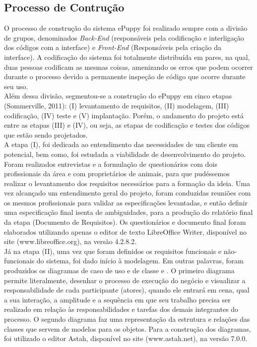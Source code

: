 \subsection{Processo de Contrução}
O processo de construção do sistema ePuppy foi realizado sempre com a divisão de grupos, denominados {\it Back-End} (responsáveis pela codificação e interligação dos códigos com a interface) e {\it Front-End} (Responsáveis pela criação da interface). A codificação do sistema foi totalmente distribuída em pares, na qual, duas pessoas codificam as mesmas coisas, amenizando os erros que podem ocorrer durante o processo devido a permanente inspeção de código que ocorre durante seu uso.
\\
\indent
Além dessa divisão, segmentou-se a construção do ePuppy em cinco etapas (Sommerville, 2011): (I) levantamento de requisitos, (II) modelagem, (III) codificação, (IV) teste e (V) implantação. Porém, o andamento do projeto está entre as etapas (III) e (IV), ou seja, as etapas de codificação e testes dos códigos que estão sendo projetados.
\\
\indent
	A etapa (I), foi dedicada ao entendimento das necessidades de um cliente em potencial, bem como, foi estudada a viabilidade de desenvolvimento do projeto. Foram realizados entrevistas e a formulação de questionários com dois profissionais da área e com proprietários de animais, para que pudéssemos realizar o levantamento dos requisitos necessários para a formação da ideia. Uma vez alcançado um entendimento geral do projeto, foram conduzidas reuniões com os mesmos profissionais para validar as especificações levantadas, e então definir uma especificação final isenta de ambiguidades, para a produção do relatório final da etapa (Documento de Requisitos). Os questionários e documento final foram elaborados utilizando apenas o editor de texto LibreOffice Writer, disponível no site (www.libreoffice.org), na versão 4.2.8.2.
\\
\indent
Já na etapa (II), uma vez que foram definidos os requisitos funcionais e não-funcionais do sistema, foi dado início à modelagem. Em outras palavras, foram produzidos os diagramas de caso de uso e de classe \cite{Fowler2005} e \cite{Bezerra2002}. O primeiro diagrama permite literalmente, desenhar o processo de execução do negócio e visualizar a responsabilidade de cada participante (atores), quando ele entrará em cena, qual a sua interação, a amplitude e a sequência em que seu trabalho precisa ser realizado em relação às responsabilidades e tarefas dos demais integrantes do processo. O segundo diagrama faz uma representação da estrutura e relações das classes que servem de modelos para os objetos. Para a construção dos diagramas, foi utilizado o editor Astah, disponível no site (www.astah.net), na versão 7.0.0.
